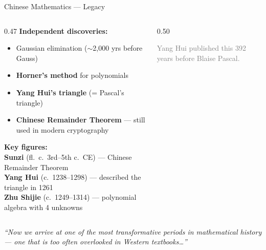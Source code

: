 \begin{frame}[shrink=25]{Chinese Mathematics --- Legacy}

  \begin{columns}[T]
    \begin{column}{0.47\textwidth}
      \textbf{Independent discoveries:}
      \begin{itemize}
        \item \alert{Gaussian elimination} ($\sim$2,000 yrs before Gauss)
        \item \textbf{Horner's method} for polynomials
        \item \textbf{Yang Hui's triangle} (= Pascal's triangle)
        \item \textbf{Chinese Remainder Theorem} --- still used in modern cryptography
      \end{itemize}

      \vspace{0.3em}
      \textbf{Key figures:}\\[0.2em]
      {\small
      \textbf{Sunzi} (fl.\ c.\ 3rd--5th c.\ CE) --- Chinese Remainder Theorem\\
      \textbf{Yang Hui} (c.\ 1238--1298) --- described the triangle in 1261\\
      \textbf{Zhu Shijie} (c.\ 1249--1314) --- polynomial algebra with 4 unknowns
      }
    \end{column}

    \begin{column}{0.50\textwidth}

      \vspace{0.3em}
      {\tiny\textcolor{gray}{Yang Hui published this 392 years before Blaise Pascal.}}
    \end{column}
  \end{columns}

  \vspace{0.3em}
  \begin{center}
    \textcolor{islamicGreen}{\emph{``Now we arrive at one of the most transformative periods in
    mathematical history --- one that is too often overlooked in Western textbooks\ldots''}}
  \end{center}

\end{frame}
